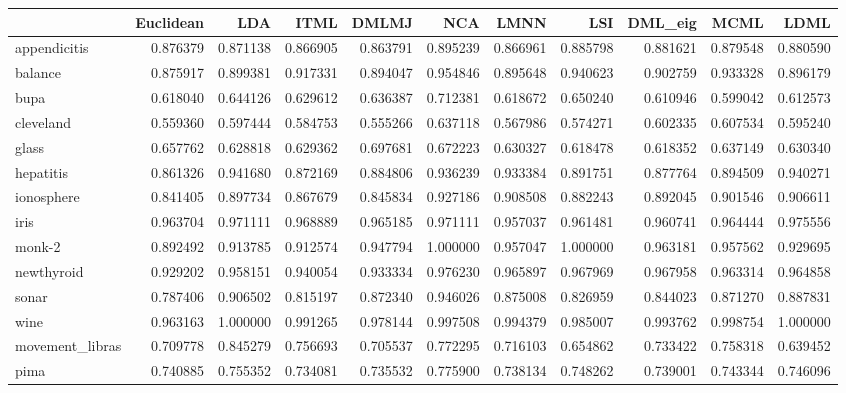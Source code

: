 \begin{tabular}{lrrrrrrrrrr}
\toprule
{} &  Euclidean &       LDA &      ITML &     DMLMJ &       NCA &      LMNN &       LSI &   DML\_eig &      MCML &      LDML \\
\midrule
appendicitis    &   0.876379 &  0.871138 &  0.866905 &  0.863791 &  0.895239 &  0.866961 &  0.885798 &  0.881621 &  0.879548 &  0.880590 \\
balance         &   0.875917 &  0.899381 &  0.917331 &  0.894047 &  0.954846 &  0.895648 &  0.940623 &  0.902759 &  0.933328 &  0.896179 \\
bupa            &   0.618040 &  0.644126 &  0.629612 &  0.636387 &  0.712381 &  0.618672 &  0.650240 &  0.610946 &  0.599042 &  0.612573 \\
cleveland       &   0.559360 &  0.597444 &  0.584753 &  0.555266 &  0.637118 &  0.567986 &  0.574271 &  0.602335 &  0.607534 &  0.595240 \\
glass           &   0.657762 &  0.628818 &  0.629362 &  0.697681 &  0.672223 &  0.630327 &  0.618478 &  0.618352 &  0.637149 &  0.630340 \\
hepatitis       &   0.861326 &  0.941680 &  0.872169 &  0.884806 &  0.936239 &  0.933384 &  0.891751 &  0.877764 &  0.894509 &  0.940271 \\
ionosphere      &   0.841405 &  0.897734 &  0.867679 &  0.845834 &  0.927186 &  0.908508 &  0.882243 &  0.892045 &  0.901546 &  0.906611 \\
iris            &   0.963704 &  0.971111 &  0.968889 &  0.965185 &  0.971111 &  0.957037 &  0.961481 &  0.960741 &  0.964444 &  0.975556 \\
monk-2          &   0.892492 &  0.913785 &  0.912574 &  0.947794 &  1.000000 &  0.957047 &  1.000000 &  0.963181 &  0.957562 &  0.929695 \\
newthyroid      &   0.929202 &  0.958151 &  0.940054 &  0.933334 &  0.976230 &  0.965897 &  0.967969 &  0.967958 &  0.963314 &  0.964858 \\
sonar           &   0.787406 &  0.906502 &  0.815197 &  0.872340 &  0.946026 &  0.875008 &  0.826959 &  0.844023 &  0.871270 &  0.887831 \\
wine            &   0.963163 &  1.000000 &  0.991265 &  0.978144 &  0.997508 &  0.994379 &  0.985007 &  0.993762 &  0.998754 &  1.000000 \\
movement\_libras &   0.709778 &  0.845279 &  0.756693 &  0.705537 &  0.772295 &  0.716103 &  0.654862 &  0.733422 &  0.758318 &  0.639452 \\
pima            &   0.740885 &  0.755352 &  0.734081 &  0.735532 &  0.775900 &  0.738134 &  0.748262 &  0.739001 &  0.743344 &  0.746096 \\

\end{tabular}
